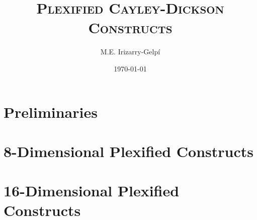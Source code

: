 \documentclass[letterpaper, 12pt]{report}
\begin{document}
\title{\textsc{Plexified Cayley-Dickson Constructs}}
\author{M.E. Irizarry-Gelp\'{i}}
\date{\today}
\maketitle
\tableofcontents
\part{Preliminaries}


\part{8-Dimensional Plexified Constructs}






\part{16-Dimensional Plexified Constructs}




\end{document}
